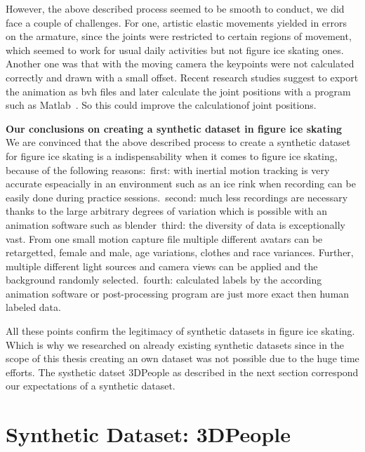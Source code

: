 However, the above described process seemed to be smooth to conduct, we did face a couple of challenges.
For one, artistic elastic movements yielded in errors on the armature, since the joints were restricted to certain
regions of movement, which seemed to work for usual daily activities but not figure ice skating ones.
Another one was that with the moving camera the keypoints were not calculated correctly and drawn with a small offset.
Recent research studies suggest to export the animation as bvh files and later calculate the joint positions with a
program such as Matlab~\cite{synpose300, 3dpeople, gaitblender}. So this could improve the calculationof joint
positions.

\textbf{Our conclusions on creating a synthetic dataset in figure ice skating}\\
We are convinced that the above described process to create a synthetic dataset for figure ice skating is a
indispensability when it comes to figure ice skating,
because of the following reasons:\
first: with inertial motion tracking is very accurate espeacially in an environment such as an ice rink when recording
can be easily done during practice sessions.\
second: much less recordings are necessary thanks to the large arbitrary degrees of variation which is possible with
an animation software such as blender\
third: the diversity of data is exceptionally vast.
From one small motion capture file multiple different avatars can be retargetted, female and male, age variations,
clothes and race variances.
Further, multiple different light sources and camera views can be applied and the background randomly selected.\
fourth: calculated labels by the according animation software or post-processing program are just more exact then
human labeled data.

All these points confirm the legitimacy of synthetic datasets in figure ice skating.
Which is why we researched on already existing synthetic datasets since in the scope of this thesis creating an own
dataset was not possible due to the huge time efforts.
The systhetic datset 3DPeople as described in the next section correspond our expectations of a synthetic dataset.






\section{Synthetic Dataset: 3DPeople}

